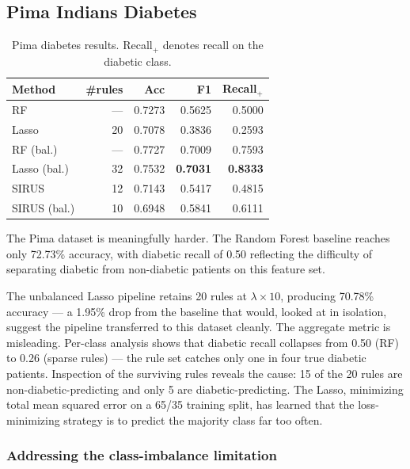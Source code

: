 \documentclass[11pt]{article}
\begin{document}
\subsection{Pima Indians Diabetes}

\begin{table}[h]
\centering
\small
\begin{tabular}{@{}lrrrr@{}}
\toprule
Method & \#rules & Acc & F1 & Recall$_+$ \\
\midrule
RF & --- & 0.7273 & 0.5625 & 0.5000 \\
Lasso & 20 & 0.7078 & 0.3836 & 0.2593 \\
RF (bal.) & --- & 0.7727 & 0.7009 & 0.7593 \\
Lasso (bal.) & 32 & 0.7532 & \textbf{0.7031} & \textbf{0.8333} \\
SIRUS & 12 & 0.7143 & 0.5417 & 0.4815 \\
SIRUS (bal.) & 10 & 0.6948 & 0.5841 & 0.6111 \\
\bottomrule
\end{tabular}
\caption{Pima diabetes results. Recall$_+$ denotes recall on the diabetic class.}
\label{tab:pima-results}
\end{table}

The Pima dataset is meaningfully harder. The Random Forest baseline reaches only 72.73\% accuracy, with diabetic recall of 0.50 reflecting the difficulty of separating diabetic from non-diabetic patients on this feature set.

The unbalanced Lasso pipeline retains 20 rules at $\lambda \times 10$, producing 70.78\% accuracy --- a 1.95\% drop from the baseline that would, looked at in isolation, suggest the pipeline transferred to this dataset cleanly. The aggregate metric is misleading. Per-class analysis shows that diabetic recall collapses from 0.50 (RF) to 0.26 (sparse rules) --- the rule set catches only one in four true diabetic patients. Inspection of the surviving rules reveals the cause: 15 of the 20 rules are non-diabetic-predicting and only 5 are diabetic-predicting. The Lasso, minimizing total mean squared error on a 65/35 training split, has learned that the loss-minimizing strategy is to predict the majority class far too often.

\subsubsection{Addressing the class-imbalance limitation}
\end{document}

